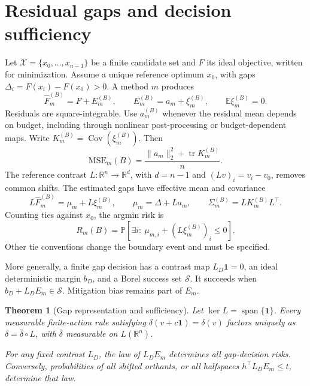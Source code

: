 \documentclass[a4paper,onecolumn,unpublished,nopdfoutputerror]{quantumarticle}
\theoremstyle{plain}
\newtheorem{theorem}{Theorem}[section]
\theoremstyle{definition}
\newcommand{\E}{\mathbb{E}}
\newcommand{\Prob}{\mathbb{P}}
\newcommand{\Cov}{\operatorname{Cov}}
\newcommand{\tr}{\operatorname{tr}}
\newcommand{\calX}{\mathcal{X}}
\newcommand{\calS}{\mathcal{S}}
\newcommand{\MSE}{\mathrm{MSE}}
\newcommand{\linspan}{\operatorname{span}}
\newcommand{\R}{\mathbb{R}}
\newcommand{\1}{\mathbf{1}}
\begin{document}
\section{Residual gaps and decision sufficiency}
\label{sec:decision_gaps}

Let $\calX=\{x_0,\ldots,x_{n-1}\}$ be a finite candidate set and $F$ its ideal objective, written for minimization. Assume a unique reference optimum $x_0$, with gaps $\Delta_i=F(x_i)-F(x_0)>0$. A method $m$ produces
\[
\widehat F_m^{(B)}=F+E_m^{(B)},\qquad E_m^{(B)}=a_m+\xi_m^{(B)},\qquad \E\xi_m^{(B)}=0.
\]
Residuals are square-integrable. Use $a_m^{(B)}$ whenever the residual mean depends on budget, including through nonlinear post-processing or budget-dependent maps. Write $K_m^{(B)}=\Cov(\xi_m^{(B)})$. Then
\begin{equation}\label{eq:mse_v6}
\MSE_m(B)=\frac{\|a_m\|_2^2+\tr K_m^{(B)}}{n}.
\end{equation}
The reference contrast $L:\R^n\to\R^d$, with $d=n-1$ and $(Lv)_i=v_i-v_0$, removes common shifts. The estimated gaps have effective mean and covariance
\begin{equation}\label{eq:gap_model}
L\widehat F_m^{(B)}=\mu_m+L\xi_m^{(B)},\qquad
\mu_m=\Delta+La_m,\qquad \Sigma_m^{(B)}=LK_m^{(B)}L^\top.
\end{equation}
Counting ties against $x_0$, the argmin risk is
\begin{equation}\label{eq:argmin_risk}
R_m(B)=\Prob[\exists i:\ \mu_{m,i}+(L\xi_m^{(B)})_i\le0].
\end{equation}
Other tie conventions change the boundary event and must be specified.

More generally, a finite gap decision has a contrast map $L_D\1=0$, an ideal deterministic margin $b_D$, and a Borel success set $\calS$. It succeeds when $b_D+L_DE_m\in\calS$. Mitigation bias remains part of $E_m$.

\begin{theorem}[Gap representation and sufficiency]
\label{thm:quotient_factorization}\label{thm:minimal_gap_law}\label{thm:gap_law_iff}
Let $\ker L=\linspan\{\1\}$. Every measurable finite-action rule satisfying $\delta(v+c\1)=\delta(v)$ factors uniquely as $\delta=\bar\delta\circ L$, with $\bar\delta$ measurable on $L(\R^n)$.

For any fixed contrast $L_D$, the law of $L_DE_m$ determines all gap-decision risks. Conversely, probabilities of all shifted orthants, or all halfspaces $h^\top L_DE_m\le t$, determine that law.
\end{theorem}
\end{document}
